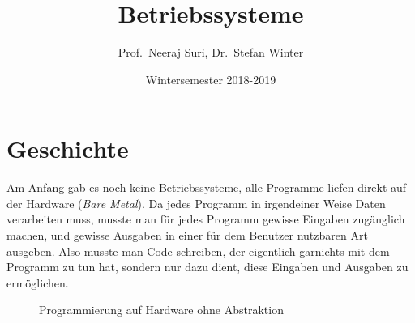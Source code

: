 \documentclass[ngerman,abstract=true]{scrartcl}
\title{Betriebssysteme}
\date{Wintersemester 2018-2019}
\author{Prof.\ Neeraj Suri, Dr.\ Stefan Winter}
\begin{document}
\maketitle
  
\tableofcontents
\newpage
  
\section{Geschichte}

Am Anfang gab es noch keine Betriebssysteme, alle Programme liefen direkt auf der Hardware (\emph{Bare Metal}). Da jedes Programm in irgendeiner Weise Daten verarbeiten muss, musste man für jedes Programm gewisse Eingaben zugänglich machen, und gewisse Ausgaben in einer für dem Benutzer nutzbaren Art ausgeben. Also musste man Code schreiben, der eigentlich garnichts mit dem Programm zu tun hat, sondern nur dazu dient, diese Eingaben und Ausgaben zu ermöglichen.

\begin{figure}[h]\centering
{}
\caption{Programmierung auf Hardware ohne Abstraktion}\label{fig:prog}
\end{figure}
\end{document}
